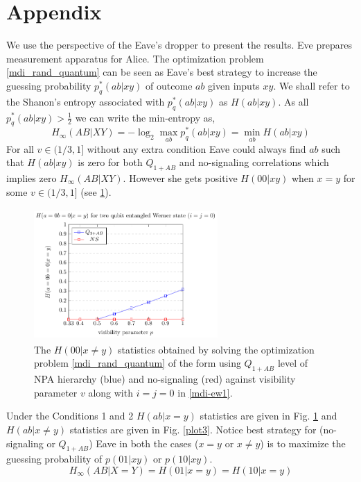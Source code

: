 \documentclass[doublecol,linenumbers]{epl2} %
\begin{document}
\section{Appendix}
We use the perspective of the Eave's dropper to present the results. Eve prepares measurement apparatus for Alice. The optimization problem \ref{mdi_rand_quantum} can be seen as Eave's best strategy to increase the guessing probability  $p_q^*(ab|xy)$ of outcome $ab$ given inputs $xy$. We shall refer to the Shanon's entropy associated with $p_q^*(ab|xy)$ as $H(ab|xy)$. As all $p_q^*(ab|xy)>\frac{1}{2}$ we can write the min-entropy as,
\begin{equation}
H_\infty(AB|XY)=-\log_2\max_{ab}p_q^*(ab|xy)=\min_{ab}H(ab|xy)
\end{equation}
For all $v\in(1/3,1]$ without any extra condition Eave could always find $ab$ such that $H(ab|xy)$ is zero for both $Q_{1+AB}$ and no-signaling correlations which implies zero $H_\infty(AB|XY)$. However she gets positive $H(00|xy)$ when $x=y$ for some $v\in (1/3,1]$ (see \ref{plot2}).
\begin{figure}[t]
\centering
\includegraphics[height=5cm,width=7cm]{nocond.pdf}
\caption{The $H(00|x\neq y)$ statistics obtained by solving the optimization problem \ref{mdi_rand_quantum} of the form using $Q_{1+AB}$ level of NPA hierarchy (blue) and no-signaling (red) against visibility parameter $v$ along with $i=j=0$ in \ref{mdi-ew1}.}\label{plot2}
\end{figure}
Under the Conditions 1 and 2 $H(ab|x=y)$ statistics are given in Fig. \ref{plot2} and $H(ab|x\neq y)$ statistics are given in Fig. \ref{plot3}. Notice best strategy for (no-signaling or $Q_{1+AB}$) Eave in both the cases ($x=y$ or $x\neq y$) is to maximize the guessing probability of $p(01|xy)$ or $p(10|xy)$. 
\begin{equation}
H_\infty(AB|X=Y)=H(01|x=y)=H(10|x=y)
\end{equation}
\end{document}

